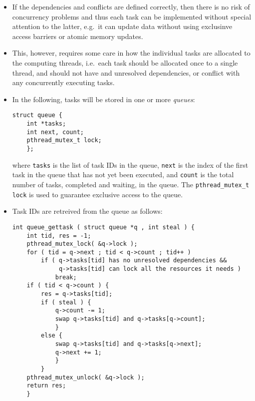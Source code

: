 \documentclass[final]{siamltex}
\begin{document}
\begin{itemize}

    \item If the dependencies and conflicts are defined correctly, then
        there is no risk of concurrency problems and thus each task
        can be implemented without special attention to the latter,
        e.g.~it can update data without using exclusinve access barriers
        or atomic memory updates.
        
    \item This, however, requires some care in how the individual tasks
        are allocated to the computing threads, i.e.~each task should
        be allocated once to a single thread, and should not have
        and unresolved dependencies, or conflict with any concurrently
        executing tasks.
        
    \item In the following, tasks will be stored in one or more {\em queues}:
        
\begin{center}\begin{minipage}{0.8\textwidth}
    \begin{lstlisting}
struct queue {
    int *tasks;
    int next, count;
    pthread_mutex_t lock;
    };
    \end{lstlisting}
\end{minipage}\end{center}

\noindent where {\tt tasks} is the list of task IDs in the queue, {\tt next}
is the index of the first task in the queue that has not yet been executed,
and {\tt count} is the total number of tasks, completed and waiting,
in the queue.
The {\tt pthread\_mutex\_t lock} is used to guarantee exclusive access
to the queue.

    \item Task IDs are retreived from the queue as follows:        

\begin{center}\begin{minipage}{0.8\textwidth}
    \begin{lstlisting}
int queue_gettask ( struct queue *q , int steal ) {
    int tid, res = -1;
    pthread_mutex_lock( &q->lock );
    for ( tid = q->next ; tid < q->count ; tid++ )
        if ( q->tasks[tid] has no unresolved dependencies &&
             q->tasks[tid] can lock all the resources it needs )
            break;
    if ( tid < q->count ) {
        res = q->tasks[tid];
        if ( steal ) {
            q->count -= 1;
            swap q->tasks[tid] and q->tasks[q->count];
            }
        else {
            swap q->tasks[tid] and q->tasks[q->next];
            q->next += 1;
            }
        }
    pthread_mutex_unlock( &q->lock );
    return res;
    }
    \end{lstlisting}
\end{minipage}\end{center}


\end{itemize}
\end{document}
